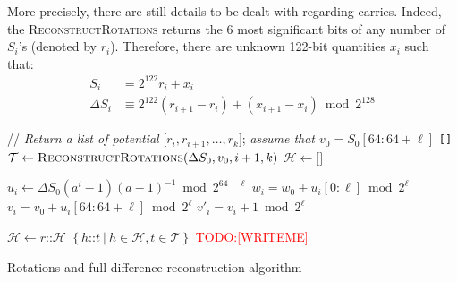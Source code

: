 \documentclass[preprint,svgnames]{iacrtrans}
\newcommand{\todo}[1]{\textcolor{red}{TODO:[#1]}}
\begin{document}
More precisely, there are still details to be dealt with regarding
carries. Indeed, the \textsc{ReconstructRotations} returns the 6 most
significant bits of any number of $S_i$'s (denoted by $r_i$). Therefore, there
are unknown 122-bit quantities $x_i$ such that:
\begin{align*}
  S_i &= 2^{122} r_i + x_i \\
  \Delta S_i &\equiv 2^{122} (r_{i+1} - r_i) + (x_{i+1} - x_{i}) \bmod 2^{128}
\end{align*}


\begin{algorithm}
\begin{algorithmic}[1]
 \State // \emph{Return a list of potential} $\texttt{[}r_i, r_{i+1}, \dots, r_k\texttt{]}$; \emph{assume that $v_0 = S_0[64:64+\ell]$}
  \State \Return \texttt{[]} 
  \EndIf
  \State $\mathcal{T} \gets \Call{ReconstructRotations}{\Delta S_0, v_0, i + 1, k}$ 
  \State $\mathcal{H} \gets \texttt{[]}$ 

  \State $u_i \gets \Delta S_0 (a^i-1)(a-1)^{-1} \bmod 2^{64+\ell}$ 
  \State $w_i = w_0 + u_i[0:\ell] \bmod 2^{\ell}$ 
  \State $v_i = v_0 + u_i[64:64+\ell] \bmod 2^{\ell}$ 
  \State $v'_i = v_i + 1 \bmod 2^{\ell}$

   
   
  \State $\mathcal{H} \gets r \texttt{::} \mathcal{H}$ 
  \EndIf
  \EndFor
  \State \Return $\left\{ h\texttt{::} t~|~ h \in \mathcal{H}, t \in \mathcal{T} \right\}$ 
  \EndFunction
  \State
  \State \todo{WRITEME}
  \EndFunction
\end{algorithmic}
\caption{Rotations and full difference reconstruction algorithm}
\end{algorithm}



\end{document}

